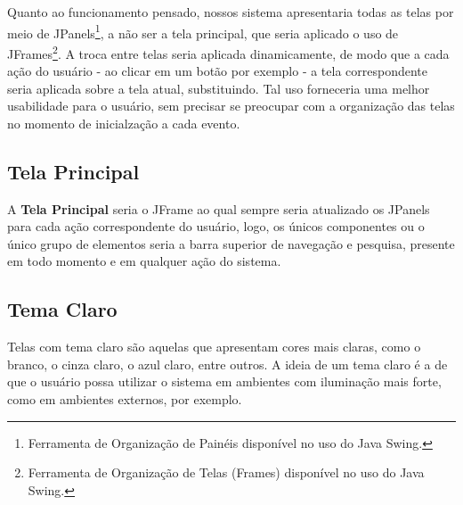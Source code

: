 \documentclass[a4paper,12pt]{article}
\begin{document}
Quanto ao funcionamento pensado, nossos sistema apresentaria todas as telas por meio de JPanels\footnote{
	Ferramenta de Organização de Painéis disponível no uso do Java Swing.
}, a não ser a tela principal, que seria aplicado o uso de JFrames\footnote{
	Ferramenta de Organização de Telas (Frames) disponível no uso do Java Swing.
}. A troca entre telas seria aplicada dinamicamente, de modo que a cada ação do usuário - ao clicar em um botão por exemplo - a 
tela correspondente seria aplicada sobre a tela atual, substituindo. Tal uso forneceria uma melhor usabilidade para o usuário, 
sem precisar se preocupar com a organização das telas no momento de inicialzação a cada evento.

\subsection{Tela Principal}
A \textbf{Tela Principal} seria o JFrame ao qual sempre seria atualizado os JPanels para cada ação correspondente do usuário, logo, 
os únicos componentes ou o único grupo de elementos seria a barra superior de navegação e pesquisa, presente em todo momento e em 
qualquer ação do sistema.

\pagebreak
\subsection{Tema Claro}
Telas com tema claro são aquelas que apresentam cores mais claras, como o branco, o cinza claro, o azul claro, entre outros. 
A ideia de um tema claro é a de que o usuário possa utilizar o sistema em ambientes com iluminação mais forte, como em ambientes 
externos, por exemplo.
\end{document}
